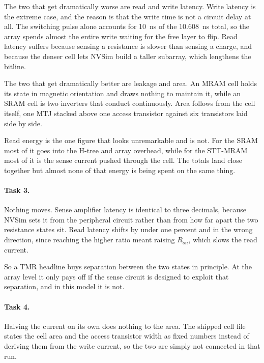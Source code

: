 \documentclass[9pt,a4paper]{extarticle}
\begin{document}
The two that get dramatically worse are read and write latency. Write
latency is the extreme case, and the reason is that the write time is not
a circuit delay at all. The switching pulse alone accounts for \SI{10}{ns}
of the \SI{10.608}{ns} total, so the array spends almost the entire write
waiting for the free layer to flip. Read latency suffers because sensing a
resistance is slower than sensing a charge, and because the denser cell
lets NVSim build a taller subarray, which lengthens the bitline.

The two that get dramatically better are leakage and area. An MRAM cell
holds its state in magnetic orientation and draws nothing to maintain it,
while an SRAM cell is two inverters that conduct continuously. Area
follows from the cell itself, one MTJ stacked above one access transistor
against six transistors laid side by side.

Read energy is the one figure that looks unremarkable and is not. For the
SRAM most of it goes into the H-tree and array overhead, while for the
STT-MRAM most of it is the sense current pushed through the cell. The
totals land close together but almost none of that energy is being spent
on the same thing.

\paragraph{Task 3.}

Nothing moves. Sense amplifier latency is identical to three decimals,
because NVSim sets it from the peripheral circuit rather than from how far
apart the two resistance states sit. Read latency shifts by under one
percent and in the wrong direction, since reaching the higher ratio meant
raising $R_{on}$, which slows the read current.

So a TMR headline buys separation between the two states in principle. At
the array level it only pays off if the sense circuit is designed to
exploit that separation, and in this model it is not.

\paragraph{Task 4.}

Halving the current on its own does nothing to the area. The shipped cell
file states the cell area and the access transistor width as fixed
numbers instead of deriving them from the write current, so the two are
simply not connected in that run.
\end{document}

